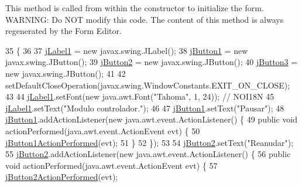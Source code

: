 This method is called from within the constructor to initialize the form. W\+A\+R\+N\+I\+NG\+: Do N\+OT modify this code. The content of this method is always regenerated by the Form Editor. 
\begin{DoxyCode}
35                                   \{
36 
37         \mbox{\hyperlink{class_sockets_1_1_modulo_control_a89f2debd0d83f763fe0bb701e05da054}{jLabel1}} = \textcolor{keyword}{new} javax.swing.JLabel();
38         \mbox{\hyperlink{class_sockets_1_1_modulo_control_a96f51c5e98e140c3840d8b7a25288101}{jButton1}} = \textcolor{keyword}{new} javax.swing.JButton();
39         \mbox{\hyperlink{class_sockets_1_1_modulo_control_a93397e8a9f08ee30ecf474a4ac9a7b9e}{jButton2}} = \textcolor{keyword}{new} javax.swing.JButton();
40         \mbox{\hyperlink{class_sockets_1_1_modulo_control_a30b4d0c6e8a1cb2425561314db79783a}{jButton3}} = \textcolor{keyword}{new} javax.swing.JButton();
41 
42         setDefaultCloseOperation(javax.swing.WindowConstants.EXIT\_ON\_CLOSE);
43 
44         \mbox{\hyperlink{class_sockets_1_1_modulo_control_a89f2debd0d83f763fe0bb701e05da054}{jLabel1}}.setFont(\textcolor{keyword}{new} java.awt.Font(\textcolor{stringliteral}{"Tahoma"}, 1, 24)); \textcolor{comment}{// NOI18N}
45         \mbox{\hyperlink{class_sockets_1_1_modulo_control_a89f2debd0d83f763fe0bb701e05da054}{jLabel1}}.setText(\textcolor{stringliteral}{"Modulo controlador."});
46 
47         \mbox{\hyperlink{class_sockets_1_1_modulo_control_a96f51c5e98e140c3840d8b7a25288101}{jButton1}}.setText(\textcolor{stringliteral}{"Pausar"});
48         \mbox{\hyperlink{class_sockets_1_1_modulo_control_a96f51c5e98e140c3840d8b7a25288101}{jButton1}}.addActionListener(\textcolor{keyword}{new} java.awt.event.ActionListener() \{
49             \textcolor{keyword}{public} \textcolor{keywordtype}{void} actionPerformed(java.awt.event.ActionEvent evt) \{
50                 \mbox{\hyperlink{class_sockets_1_1_modulo_control_ae864493081b3e1283a46cdc204ce5901}{jButton1ActionPerformed}}(evt);
51             \}
52         \});
53 
54         \mbox{\hyperlink{class_sockets_1_1_modulo_control_a93397e8a9f08ee30ecf474a4ac9a7b9e}{jButton2}}.setText(\textcolor{stringliteral}{"Reanudar"});
55         \mbox{\hyperlink{class_sockets_1_1_modulo_control_a93397e8a9f08ee30ecf474a4ac9a7b9e}{jButton2}}.addActionListener(\textcolor{keyword}{new} java.awt.event.ActionListener() \{
56             \textcolor{keyword}{public} \textcolor{keywordtype}{void} actionPerformed(java.awt.event.ActionEvent evt) \{
57                 \mbox{\hyperlink{class_sockets_1_1_modulo_control_a015a69f71af71f04bd6ebd98ff9256ce}{jButton2ActionPerformed}}(evt);

\end{DoxyCode}
